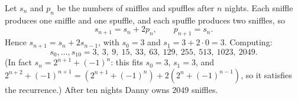 Let $s_n$ and $p_n$ be the numbers of sniffles and spuffles after $n$ nights. Each sniffle produces one sniffle and one spuffle, and each spuffle produces two sniffles, so
\[
s_{n+1}=s_n+2p_n,\qquad p_{n+1}=s_n .
\]
Hence $s_{n+1}=s_n+2s_{n-1}$, with $s_0=3$ and $s_1=3+2\cdot0=3$. Computing:
\[
s_0,\dots,s_{10}=3,\ 3,\ 9,\ 15,\ 33,\ 63,\ 129,\ 255,\ 513,\ 1023,\ 2049 .
\]
(In fact $s_n=2^{n+1}+(-1)^n$: this fits $s_0=3$, $s_1=3$, and $2^{n+2}+(-1)^{n+1}=\left(2^{n+1}+(-1)^n\right)+2\left(2^n+(-1)^{n-1}\right)$, so it satisfies the recurrence.) After ten nights Danny owns $\boxed{2049}$ sniffles.
